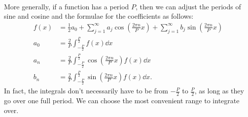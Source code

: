 \documentclass[../classical_mechanics.tex]{subfiles}
\begin{document}
        \paragraph{}
        More generally, if a function has a period $P$, then we can adjust the periods of sine and cosine and the formulae for the coefficients as follows:
        \begin{align}
            f(x)&=\frac{1}{2}a_0+\sum_{j=1}^\infty a_j\cos\left(\frac{2\pi n}{P}x\right)+\sum_{j=1}^\infty b_j\sin\left(\frac{2\pi n}{P}x\right)\\
            a_0&=\frac{2}{P}\int_{-\frac{P}{2}}^{\frac{P}{2}}f(x)\dd{x}\\
            a_n&=\frac{2}{P}\int_{-\frac{P}{2}}^{\frac{P}{2}}\cos\left(\frac{2\pi n}{P}x\right)f(x)\dd{x}\\
            b_n&=\frac{2}{P}\int_{-\frac{P}{2}}^{\frac{P}{2}}\sin\left(\frac{2\pi n}{P}x\right)f(x)\dd{x}.
        \end{align}
        In fact, the integrals don't necessarily have to be from $-\frac{P}{2}$ to $\frac{P}{2}$, as long as they go over one full period.
        We can choose the most convenient range to integrate over.
\end{document}
